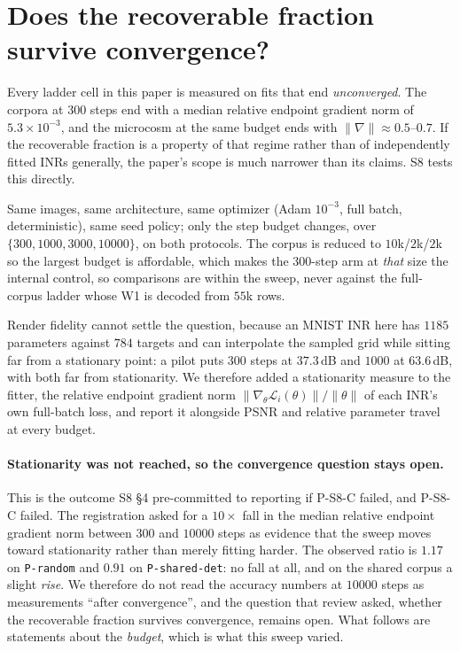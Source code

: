 
\section{Does the recoverable fraction survive convergence?}\label{app:convergence}

Every ladder cell in this paper is measured on fits that end \emph{unconverged}. The corpora at
$300$ steps end with a median relative endpoint gradient norm of $5.3\times10^{-3}$, and the
microcosm at the same budget ends with $\|\nabla\|\approx0.5$--$0.7$. If the recoverable fraction is
a property of that regime rather than of independently fitted INRs generally, the paper's scope is
much narrower than its claims. S8 tests this directly.

Same images, same architecture, same optimizer (Adam $10^{-3}$, full batch, deterministic), same
seed policy; only the step budget changes, over $\{300, 1000, 3000, 10000\}$, on both protocols. The
corpus is reduced to $10$k/$2$k/$2$k so the largest budget is affordable, which makes the
$300$-step arm at \emph{that} size the internal control, so comparisons are within the sweep, never
against the full-corpus ladder whose W1 is decoded from $55$k rows.

Render fidelity cannot settle the question, because an MNIST INR here has $1185$ parameters against
$784$ targets and can interpolate the sampled grid while sitting far from a stationary point: a
pilot puts $300$ steps at $37.3$\,dB and $1000$ at $63.6$\,dB, with both far from stationarity. We
therefore added a stationarity measure to the fitter, the relative endpoint gradient norm
$\|\nabla_\theta \mathcal L_i(\theta)\|/\|\theta\|$ of each INR's own full-batch loss, and report it alongside PSNR and relative parameter travel at every budget.



\paragraph{Stationarity was not reached, so the convergence question stays open.} This is the outcome S8 §4 pre-committed to reporting if P-S8-C failed, and P-S8-C failed.
The registration asked for a $10\times$ fall in the median relative endpoint gradient norm between
$300$ and $10000$ steps as evidence that the sweep moves toward stationarity rather than merely
fitting harder. The observed ratio is $1.17$ on \texttt{P-random} and $0.91$ on
\texttt{P-shared-det}: no fall at all, and on the shared corpus a slight \emph{rise}. We therefore
do not read the accuracy numbers at $10000$ steps as measurements ``after convergence'', and the
question that review asked, whether the recoverable fraction survives convergence, remains
open. What follows are statements about the \emph{budget}, which is what this sweep varied.

